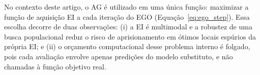 No contexto deste artigo, o AG é utilizado em uma única função: maximizar a função de aquisição EI a cada iteração do EGO (Equação~\eqref{eq:ego_step}). Essa escolha decorre de duas observações: (i) a EI é multimodal e a robustez de uma busca populacional reduz o risco de aprisionamento em ótimos locais espúrios da própria EI; e (ii) o orçamento computacional desse problema interno é folgado, pois cada avaliação envolve apenas predições do modelo substituto, e não chamadas à função objetivo real.
